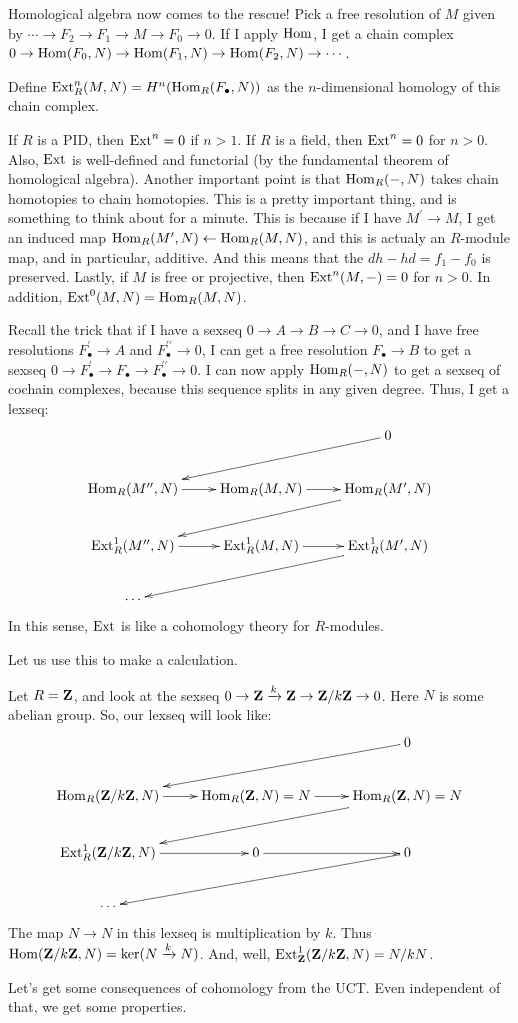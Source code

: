 Homological algebra now comes to the rescue! Pick a free resolution of $M$ given by $\cdots\to F_2\to F_1\to M\to F_0\to 0$. If I apply $\operatorname{Hom}$, I get a chain complex $0\to \operatorname{Hom}(F_0,N)\to \operatorname{Hom}(F_1,N)\to \operatorname{Hom}(F_2,N)\to\cdots$.
\begin{definition}
Define $\operatorname{Ext}_R^n(M,N)= H^n(\operatorname{Hom}_R(F_\bullet,N))$ as the $n$-dimensional homology of this chain complex.
\end{definition}
\begin{remark}
If $R$ is a PID, then $\operatorname{Ext}^n=0$ if $n>1$. If $R$ is a field, then $\operatorname{Ext}^n=0$ for $n>0$. Also, $\operatorname{Ext}$ is well-defined and functorial (by the fundamental theorem of homological algebra). Another important point is that $\operatorname{Hom}_R(-,N)$ takes chain homotopies to chain homotopies. This is a pretty important thing, and is something to think about for a minute. This is because if I have $M^\prime\to M$, I get an induced map $\operatorname{Hom}_R(M^\prime,N)\leftarrow\operatorname{Hom}_R(M,N)$, and this is actualy an $R$-module map, and in particular, additive. And this means that the $dh-hd=f_1-f_0$ is preserved. Lastly, if $M$ is free or projective, then $\operatorname{Ext}^n(M,-)=0$ for $n>0$. In addition, $\operatorname{Ext}^0(M,N)=\operatorname{Hom}_R(M,N)$.
\end{remark}
Recall the trick that if I have a sexseq $0\to A\to B\to C\to 0$, and I have free resolutions $F^\prime_\bullet\to A$ and $F^{\prime\prime}_\bullet\to 0$, I can get a free resolution $F_\bullet\to B$ to get a sexseq $0\to F^\prime_\bullet\to F_\bullet\to F^{\prime\prime}_\bullet\to 0$. I can now apply $\operatorname{Hom}_R(-,N)$ to get a sexseq of cochain complexes, because this sequence splits in any given degree. Thus, I get a lexseq:
\begin{equation*}
\xymatrix{ & & 0\ar[dll]\\
\Hom_R(M^{\prime\prime},N)\ar[r] & \Hom_R(M,N)\ar[r] & \Hom_R(M^{\prime},N)\ar[dll]\\
\Ext^1_R(M^{\prime\prime},N)\ar[r] & \Ext^1_R(M,N)\ar[r] & \Ext^1_R(M^{\prime},N)\ar[dll]\\
\cdots & &}
\end{equation*}
In this sense, $\operatorname{Ext}$ is like a cohomology theory for $R$-modules.

Let us use this to make a calculation.
\begin{example}
Let $R=\mathbf Z$, and look at the sexseq $0\to \mathbf Z\xrightarrow{k}\mathbf Z\to\mathbf Z/k\mathbf Z\to 0$. Here $N$ is some abelian group. So, our lexseq will look like:
\begin{equation*}
\xymatrix{ & & 0\ar[dll]\\
\Hom_R(\Z/k\Z,N)\ar[r] & \Hom_R(\Z,N)=N\ar[r] & \Hom_R(\Z,N)=N\ar[dll]\\
\Ext^1_R(\Z/k\Z,N)\ar[r] & 0\ar[r] & 0\ar[dll]\\
\cdots & &}
\end{equation*}
The map $N\to N$ in this lexseq is multiplication by $k$. Thus $\operatorname{Hom}(\mathbf Z/k\mathbf Z,N)=\ker(N\xrightarrow{k}N)$. And, well, $\operatorname{Ext}^1_\mathbf Z(\mathbf Z/k\mathbf Z,N)=N/kN$.
\end{example}
Let's get some consequences of cohomology from the UCT. Even independent of that, we get some properties.
